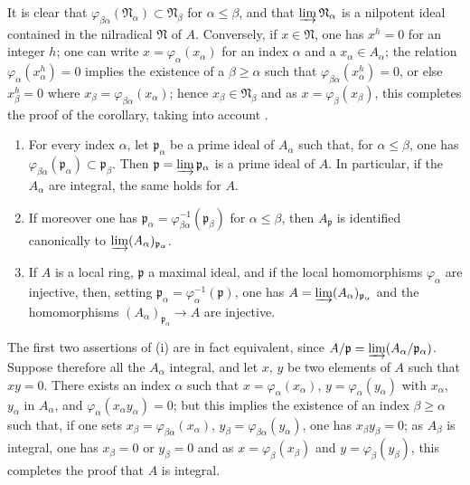 
It is clear that $\varphi_{\beta\alpha}(\mathfrak{N}_\alpha)\subset\mathfrak{N}_\beta$ for $\alpha\leqslant\beta$, and that $\varinjlim\mathfrak{N}_\alpha$ is a nilpotent ideal contained in the nilradical $\mathfrak{N}$ of $A$.
Conversely, if $x\in\mathfrak{N}$, one has $x^h=0$ for an integer $h$; one can write $x=\varphi_\alpha(x_\alpha)$ for an index $\alpha$ and a $x_\alpha\in A_\alpha$; the relation $\varphi_\alpha(x_\alpha^h)=0$ implies the existence of a $\beta\geqslant\alpha$ such that $\varphi_{\beta\alpha}(x_\alpha^h)=0$, or else $x_\beta^h=0$ where $x_\beta=\varphi_{\beta\alpha}(x_\alpha)$; hence $x_\beta\in\mathfrak{N}_\beta$ and as $x=\varphi_\beta(x_\beta)$, this completes the proof of the corollary, taking into account .

\begin{proposition}[5.13.3]
\label{IV.5.13.3}
\begin{enumerate}
  \item[\rm(i)] For every index $\alpha$, let $\mathfrak{p}_\alpha$ be a prime ideal of $A_\alpha$ such that, for $\alpha\leqslant\beta$, one has $\varphi_{\beta\alpha}(\mathfrak{p}_\alpha)\subset\mathfrak{p}_\beta$.
Then $\mathfrak{p}=\varinjlim\mathfrak{p}_\alpha$ is a prime ideal of $A$.
In particular, if the $A_\alpha$ are integral, the same holds for $A$.
  \item[\rm(ii)] If moreover one has $\mathfrak{p}_\alpha=\varphi_{\beta\alpha}^{-1}(\mathfrak{p}_\beta)$ for $\alpha\leqslant\beta$, then $A_\mathfrak{p}$ is identified canonically to $\varinjlim(A_\alpha)_{\mathfrak{p}_\alpha}$.
  \item[\rm(iii)] If $A$ is a local ring, $\mathfrak{p}$ a maximal ideal, and if the local homomorphisms $\varphi_\alpha$ are injective, then, setting $\mathfrak{p}_\alpha=\varphi_\alpha^{-1}(\mathfrak{p})$, one has $A=\varinjlim(A_\alpha)_{\mathfrak{p}_\alpha}$ and the homomorphisms $(A_\alpha)_{\mathfrak{p}_\alpha}\to A$ are injective.
\end{enumerate}
\end{proposition}

The first two assertions of (i) are in fact equivalent, since $A/\mathfrak{p}=\varinjlim(A_\alpha/\mathfrak{p}_\alpha)$.
Suppose therefore all the $A_\alpha$ integral, and let $x$, $y$ be two elements of $A$ such that $xy=0$.
There exists an index $\alpha$ such that $x=\varphi_\alpha(x_\alpha)$, $y=\varphi_\alpha(y_\alpha)$ with $x_\alpha$, $y_\alpha$ in $A_\alpha$, and $\varphi_\alpha(x_\alpha y_\alpha)=0$; but this implies the existence of an index $\beta\geqslant\alpha$ such that, if one sets $x_\beta=\varphi_{\beta\alpha}(x_\alpha)$, $y_\beta=\varphi_{\beta\alpha}(y_\alpha)$, one has $x_\beta y_\beta=0$; as $A_\beta$ is integral, one has $x_\beta=0$ or $y_\beta=0$ and as $x=\varphi_\beta(x_\beta)$ and $y=\varphi_\beta(y_\beta)$, this completes the proof that $A$ is integral.

